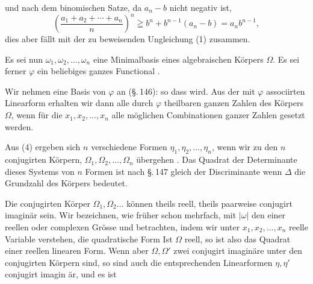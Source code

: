 
und nach dem binomischen Satze, da $a_n - b$ nicht negativ ist,
\[ \left(\frac{a_1 + a_2 + \cdots + a_n}{n}\right)^n \geqq b^n + b^{n-1}(a_n - b) = a_n b^{n-1}, \]
dies aber f\"allt mit der zu beweisenden Ungleichung (1) zusammen.

Es sei nun $\omega_1, \omega_2, \ldots, \omega_n$ eine Minimalbasis eines algebraischen
 K\"orpers $\Omega$. Es sei ferner $\varphi$ ein beliebiges ganzes Functional
.

Wir nehmen eine Basis von $\varphi$ an (\S.\,146):
so dass
wird. Aus der mit $\varphi$ associirten Linearform
erhalten wir dann alle durch $\varphi$ theilbaren ganzen Zahlen des
K\"orpers $\Omega$, wenn f\"ur die $x_1, x_2, \ldots, x_n$ alle m\"oglichen Combinationen
 ganzer Zahlen gesetzt werden.

Aus (4) ergeben sich $n$ verschiedene Formen $\eta_1, \eta_2, \ldots, \eta_n$,
wenn wir zu den $n$ conjugirten K\"orpern, $\Omega_1, \Omega_2, \ldots, \Omega_n$ \"ubergehen
. Das Quadrat der Determinante dieses Systems von
$n$ Formen ist nach \S.\,147 gleich der Discriminante
wenn $\Delta$ die Grundzahl des K\"orpers bedeutet.

Die conjugirten K\"orper $\Omega_1, \Omega_2 \ldots$ k\"onnen theils reell, theils
paarweise conjugirt imagin\"ar sein. Wir bezeichnen, wie fr\"uher
schon mehrfach, mit $|\omega|$ den  einer reellen
oder complexen Gr\"osse und betrachten, indem wir unter
$x_1, x_2, \ldots, x_n$ reelle Variable verstehen, die quadratische Form
Ist $\Omega$ reell, so ist
also das Quadrat einer reellen linearen Form. Wenn aber $\Omega, \Omega'$
zwei conjugirt imagin\"are unter den conjugirten K\"orpern sind, so
sind auch die entsprechenden Linearformen $\eta, \eta'$ conjugirt imagin
\"ar, und es ist
